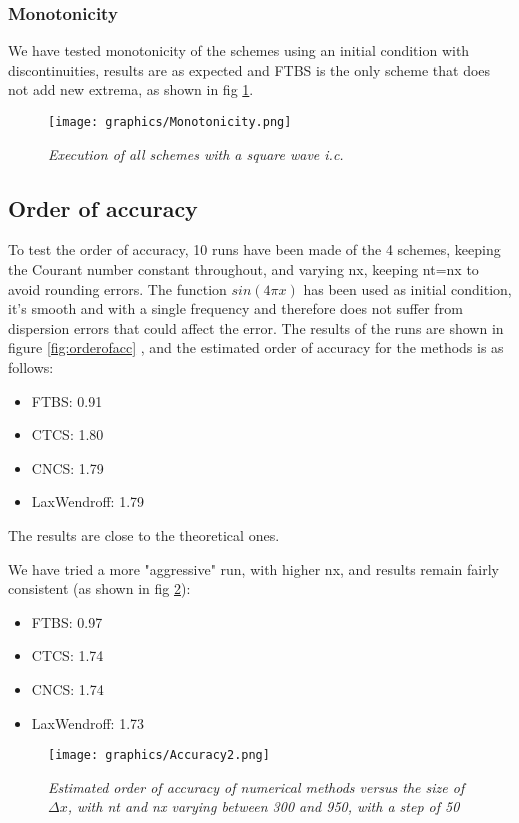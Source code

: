 \subsubsection{Monotonicity}
We have tested monotonicity of the schemes using an initial condition with discontinuities, results are as expected and FTBS is the only scheme that does not add new extrema, as shown in fig \ref{fig:mono}.
\begin{figure}[H]
	\begin{center}
		\texttt{[image: graphics/Monotonicity.png]}
	\end{center}%
	\caption[Monotonicity]{ \em Execution of all schemes with a square wave i.c.}
	\label{fig:mono}
\end{figure}

\subsection{Order of accuracy}
To test the order of accuracy, 10 runs have been made of the 4 schemes, keeping the Courant number constant throughout, and varying nx, keeping nt=nx to avoid rounding errors. The function $sin(4\pi x)$ has been used as initial condition, it's smooth and with a single frequency and therefore does not suffer from dispersion errors that could affect the error.
The results of the runs are shown in figure \ref{fig:orderofacc} , and the estimated order of accuracy for the methods is as follows:
\begin{itemize}
\item FTBS: 0.91
\item CTCS: 1.80
\item CNCS: 1.79
\item LaxWendroff: 1.79
\end{itemize}
The results are close to the theoretical ones.

We have tried a more "aggressive" run, with higher nx, and results remain fairly consistent (as shown in fig \ref{fig:orderofacc2}):
\begin{itemize}
	\item FTBS: 0.97
	\item CTCS: 1.74
	\item CNCS: 1.74
	\item LaxWendroff: 1.73
\end{itemize}

\begin{figure}[H]
	\begin{center}
		\texttt{[image: graphics/Accuracy2.png]}
	\end{center}%
	\caption[Order of accuracy of numerical methods]{ \em Estimated order of accuracy of numerical methods versus the size of $\Delta x$, with nt and nx varying between 300 and 950, with a step of 50}
	\label{fig:orderofacc2}
\end{figure}

